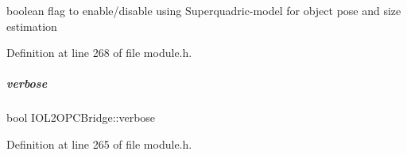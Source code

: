 boolean flag to enable/disable using Superquadric-\/model for object pose and size estimation 



Definition at line 268 of file module.\+h.

\mbox{\label{group__iol2opc_af6ea487a8920c984b65bbf94f3dd9b7d}} 
\subparagraph{\texorpdfstring{verbose}{verbose}}
{\footnotesize\ttfamily bool I\+O\+L2\+O\+P\+C\+Bridge\+::verbose\hspace{0.3cm}{\ttfamily [protected]}}



Definition at line 265 of file module.\+h.

